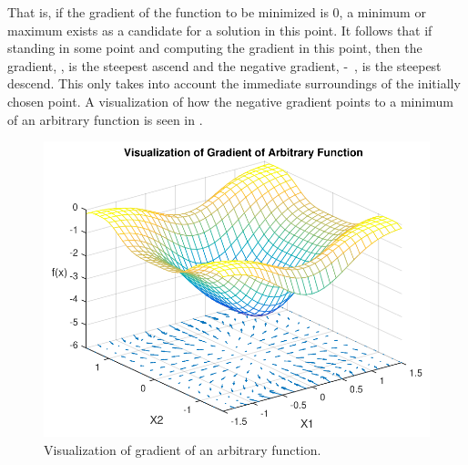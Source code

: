 That is, if the gradient of the function to be minimized is 0, a minimum or maximum exists as a candidate for a solution in this point. It follows that if standing in some point and computing the gradient in this point, then the gradient, \si{}, is the steepest ascend and the negative gradient, \si{-}, is the steepest descend. This only takes into account the immediate surroundings of the initially chosen point. A visualization of how the negative gradient points to a minimum of an arbitrary function is seen in .

\begin{figure}[H] 
	\centering
	\includegraphics[width=.8\textwidth]{figures/visualizationOfGradient}
	\caption{Visualization of gradient of an arbitrary function.}
	\label{visualizationOfGradient}
\end{figure}

